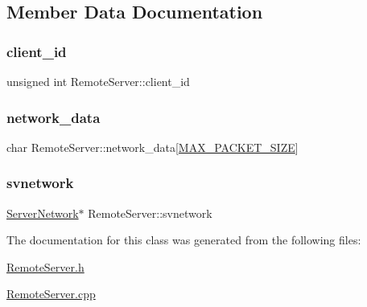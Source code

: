 \subsection{Member Data Documentation}
\mbox{\label{class_remote_server_a111deb3aa24baa094cc709854e489622}} 
\subsubsection{\texorpdfstring{client\+\_\+id}{client\_id}}
{\footnotesize\ttfamily unsigned int Remote\+Server\+::client\+\_\+id}

\mbox{\label{class_remote_server_a881760eeafe5ee6209650459c7440473}} 
\subsubsection{\texorpdfstring{network\+\_\+data}{network\_data}}
{\footnotesize\ttfamily char Remote\+Server\+::network\+\_\+data\mbox{[}\mbox{\hyperlink{_network_data_8h_a879456c3b8e2853f7044d764e9c180d4}{M\+A\+X\+\_\+\+P\+A\+C\+K\+E\+T\+\_\+\+S\+I\+ZE}}\mbox{]}}

\mbox{\label{class_remote_server_affc39f22472abb8f9ff319f1319f3bdb}} 
\subsubsection{\texorpdfstring{svnetwork}{svnetwork}}
{\footnotesize\ttfamily \mbox{\hyperlink{class_server_network}{Server\+Network}}$\ast$ Remote\+Server\+::svnetwork}



The documentation for this class was generated from the following files\+:\begin{DoxyCompactItemize}
\item 
\mbox{\hyperlink{_remote_server_8h}{Remote\+Server.\+h}}\item 
\mbox{\hyperlink{_remote_server_8cpp}{Remote\+Server.\+cpp}}\end{DoxyCompactItemize}
